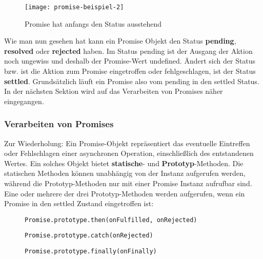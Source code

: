 \begin{figure}[H]
\centering
\texttt{[image: promise-beispiel-2]}
\caption{Promise hat anfangs den Status \glqq{}ausstehend\grqq{}}
\end{figure}

\noindent
Wie man nun gesehen hat kann ein Promise Objekt den Status \textbf{pending}, \textbf{resolved} oder \textbf{rejected} haben. Im Status pending ist der Ausgang der Aktion noch ungewiss und deshalb der Promise-Wert undefined. Ändert sich der Status bzw. ist die Aktion zum Promise eingetroffen oder fehlgeschlagen, ist der Status \textbf{settled}. Grundsätzlich läuft ein Promise also vom pending in den settled Status. In der nächsten Sektion wird auf das Verarbeiten von Promises näher eingegangen.

\subsubsection{Verarbeiten von Promises}

Zur Wiederholung: Ein Promise-Objekt repräsentiert das eventuelle Eintreffen oder Fehlschlagen einer asynchronen Operation, einschließlich des entstandenen Wertes. Ein solches Objekt bietet \textbf{statische}- und \textbf{Prototyp}-Methoden. Die statischen Methoden können unabhängig von der Instanz aufgerufen werden, während die Prototyp-Methoden nur mit einer Promise Instanz aufrufbar sind. Eine oder mehrere der drei Prototyp-Methoden werden aufgerufen, wenn ein Promise in den settled Zustand eingetroffen ist:

\begin{description}

\begin{figure}[H]
\item \begin{lstlisting}[basicstyle=\small]
Promise.prototype.then(onFulfilled, onRejected)
\end{lstlisting}
\end{figure}

\begin{figure}[H]
\item \begin{lstlisting}[basicstyle=\small]
Promise.prototype.catch(onRejected)
\end{lstlisting}
\end{figure}
 
\begin{figure}[H]
\item \begin{lstlisting}[basicstyle=\small]
Promise.prototype.finally(onFinally)
\end{lstlisting}
\end{figure}
 
\end{description}


